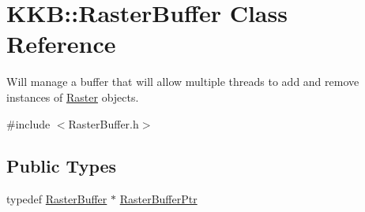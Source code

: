 \hypertarget{class_k_k_b_1_1_raster_buffer}{}\section{K\+KB\+:\+:Raster\+Buffer Class Reference}
\label{class_k_k_b_1_1_raster_buffer}


Will manage a buffer that will allow multiple threads to add and remove instances of \textquotesingle{}\hyperlink{class_k_k_b_1_1_raster}{Raster}\textquotesingle{} objects.  




{\ttfamily \#include $<$Raster\+Buffer.\+h$>$}

\subsection*{Public Types}
\begin{DoxyCompactItemize}
\item 
typedef \hyperlink{class_k_k_b_1_1_raster_buffer}{Raster\+Buffer} $\ast$ \hyperlink{class_k_k_b_1_1_raster_buffer_a1dc33d464c891b33bf9cf582d072d070}{Raster\+Buffer\+Ptr}
\end{DoxyCompactItemize}

